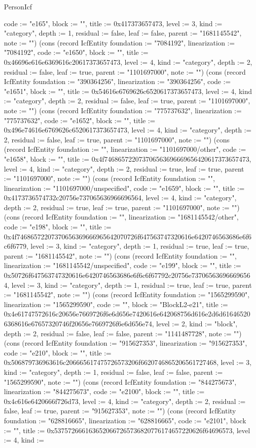 \begin{lexlean}{PersonIcf}
\begin{semanticmodule}
{code := "e165", block := "", title := 0x417373657473, level := 3, kind := "category", depth := 1, residual := false, leaf := false, parent := "1681145542", note := ""}) (cons (record IcfEntity {foundation := "7084192", linearization := "7084192", code := "e1650", block := "", title := 0x46696e616e6369616c20617373657473, level := 4, kind := "category", depth := 2, residual := false, leaf := true, parent := "1101697000", note := ""}) (cons (record IcfEntity {foundation := "390364256", linearization := "390364256", code := "e1651", block := "", title := 0x54616e6769626c6520617373657473, level := 4, kind := "category", depth := 2, residual := false, leaf := true, parent := "1101697000", note := ""}) (cons (record IcfEntity {foundation := "775737632", linearization := "775737632", code := "e1652", block := "", title := 0x496e74616e6769626c6520617373657473, level := 4, kind := "category", depth := 2, residual := false, leaf := true, parent := "1101697000", note := ""}) (cons (record IcfEntity {foundation := "", linearization := "1101697000/other", code := "e1658", block := "", title := 0x4f746865722073706563696669656420617373657473, level := 4, kind := "category", depth := 2, residual := true, leaf := true, parent := "1101697000", note := ""}) (cons (record IcfEntity {foundation := "", linearization := "1101697000/unspecified", code := "e1659", block := "", title := 0x4173736574732c20756e737065636966696564, level := 4, kind := "category", depth := 2, residual := true, leaf := true, parent := "1101697000", note := ""}) (cons (record IcfEntity {foundation := "", linearization := "1681145542/other", code := "e198", block := "", title := 0x4f74686572207370656369666965642070726f647563747320616e6420746563686e6f6c6f6779, level := 3, kind := "category", depth := 1, residual := true, leaf := true, parent := "1681145542", note := ""}) (cons (record IcfEntity {foundation := "", linearization := "1681145542/unspecified", code := "e199", block := "", title := 0x50726f647563747320616e6420746563686e6f6c6f67792c20756e737065636966696564, level := 3, kind := "category", depth := 1, residual := true, leaf := true, parent := "1681145542", note := ""}) (cons (record IcfEntity {foundation := "1565299590", linearization := "1565299590", code := "", block := "BlockL2-e21", title := 0x4e61747572616c20656e7669726f6e6d656e7420616e642068756d616e2d6d616465206368616e67657320746f20656e7669726f6e6d656e74, level := 2, kind := "block", depth := 2, residual := false, leaf := false, parent := "1141487728", note := ""}) (cons (record IcfEntity {foundation := "915627353", linearization := "915627353", code := "e210", block := "", title := 0x506879736963616c206665617475726573206f6620746865206561727468, level := 3, kind := "category", depth := 1, residual := false, leaf := false, parent := "1565299590", note := ""}) (cons (record IcfEntity {foundation := "844275673", linearization := "844275673", code := "e2100", block := "", title := 0x4c616e6420666f726d73, level := 4, kind := "category", depth := 2, residual := false, leaf := true, parent := "915627353", note := ""}) (cons (record IcfEntity {foundation := "628816665", linearization := "628816665", code := "e2101", block := "", title := 0x5375726661636520667265736820776174657220626f64696573, level := 4, kind := }
\end{semanticmodule}
\end{lexlean}
